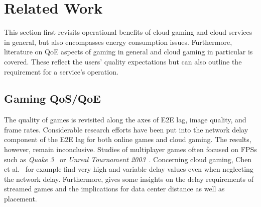 \section{Related Work}
\label{sec:relatedwork}

This section first revisits operational benefits of cloud gaming and cloud services in general, but also encompasses energy consumption issues. Furthermore, literature on \gls{QoE} aspects of gaming in general and cloud gaming in particular is covered. These reflect the users' quality expectations but can also outline the requirement for a service's operation.



\subsection{Gaming QoS/QoE}

The quality of games is revisited along the axes of \gls{E2E} lag, image quality, and frame rates.
Considerable research efforts have been put into the network delay component of the \gls{E2E} lag for both online games and cloud gaming. The results, however, remain inconclusive. Studies of multiplayer games often focused on \glspl{FPS} such as \textit{Quake 3}~\cite{1266180} or \textit{Unreal Tournament 2003}~\cite{Beigbeder:2004:ELL:1016540.1016556}. Concerning cloud gaming, Chen et al.~\cite{6670099} for example find very high and variable delay values even when neglecting the network delay. Furthermore, \cite{Choy:2012:BSC:2501560.2501563} gives some insights on the delay requirements of streamed games and the implications for data center distance as well as placement.


